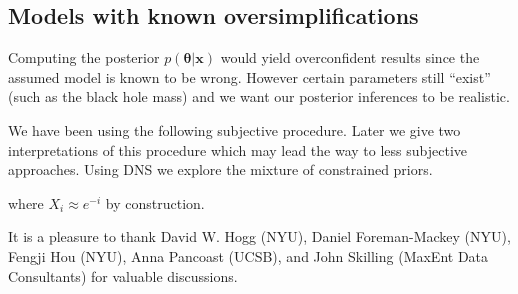 \documentclass[
  ,final            %
  ]
  {aipproc}
\newcommand{\pars}{\boldsymbol{\theta}}
\newcommand{\data}{\mathbf{x}}
\begin{document}
\subsection{Models with known oversimplifications}
Computing the posterior $p(\pars | \data)$ would yield overconfident results
since the assumed model is known to be wrong. However certain parameters still
``exist'' (such as the black hole mass) and we want our posterior inferences
to be realistic.

We have been using the following subjective procedure. Later we give two
interpretations of this procedure which may lead the way to less subjective
approaches.
Using DNS we explore the mixture of constrained priors.

where $X_i \approx e^{-i}$ by construction.


\begin{theacknowledgments}
It is a pleasure to thank David W. Hogg (NYU), Daniel Foreman-Mackey (NYU),
Fengji Hou (NYU), Anna Pancoast (UCSB), and
John Skilling (MaxEnt Data Consultants) for valuable discussions.
\end{theacknowledgments}




%

\end{document}
